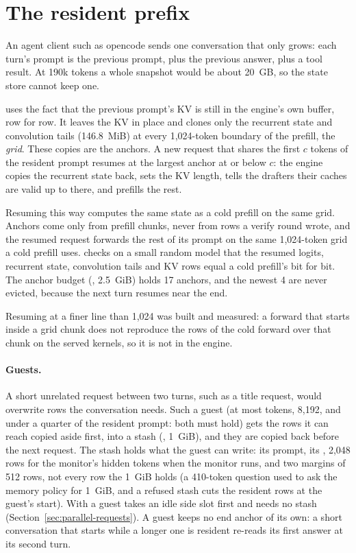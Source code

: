 \section{The resident prefix}\label{sec:resident}

An agent client such as opencode sends one conversation that only grows: each turn's prompt is the previous prompt, plus the previous answer, plus a tool result. At 190k tokens a whole snapshot would be about 20~GB, so the state store cannot keep one.

 uses the fact that the previous prompt's KV is still in the engine's own buffer, row for row. It leaves the KV in place and clones only the recurrent state and convolution tails (146.8~MiB) at every 1,024-token boundary of the prefill, the \emph{grid}. These copies are the anchors. A new request that shares the first $c$ tokens of the resident prompt resumes at the largest anchor at or below $c$: the engine copies the recurrent state back, sets the KV length, tells the drafters their caches are valid up to there, and prefills the rest.

Resuming this way computes the same state as a cold prefill on the same grid. Anchors come only from prefill chunks, never from rows a verify round wrote, and the resumed request forwards the rest of its prompt on the same 1,024-token grid a cold prefill uses.  checks on a small random model that the resumed logits, recurrent state, convolution tails and KV rows equal a cold prefill's bit for bit. The anchor budget (, 2.5~GiB) holds 17 anchors, and the newest 4 are never evicted, because the next turn resumes near the end.

Resuming at a finer line than 1,024 was built and measured: a forward that starts inside a grid chunk does not reproduce the rows of the cold forward over that chunk on the served kernels, so it is not in the engine.

\paragraph{Guests.} A short unrelated request between two turns, such as a title request, would overwrite rows the conversation needs. Such a guest (at most  tokens, 8,192, and under a quarter of the resident prompt: both must hold) gets the rows it can reach copied aside first, into a stash (, 1~GiB), and they are copied back before the next request. The stash holds what the guest can write: its prompt, its , 2,048 rows for the monitor's hidden tokens when the monitor runs, and two margins of 512 rows, not every row the 1~GiB holds (a 410-token question used to ask the memory policy for 1~GiB, and a refused stash cuts the resident rows at the guest's start). With  a guest takes an idle side slot first and needs no stash (Section~\ref{sec:parallel-requests}). A guest keeps no end anchor of its own: a short conversation that starts while a longer one is resident re-reads its first answer at its second turn.

